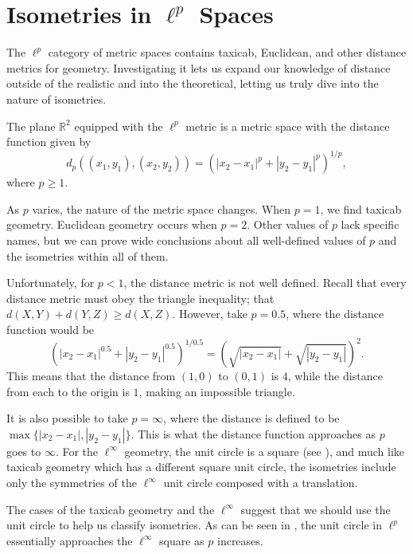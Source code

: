 \documentclass{mystyle}
\begin{document}
\section{Isometries in $\ell^p$ Spaces}\label{sec_five}
The $\ell^p$ category of metric spaces contains taxicab, Euclidean, and other distance metrics for geometry. Investigating it lets us expand our knowledge of distance outside of the realistic and into the theoretical, letting us truly dive into the nature of isometries.

The plane $\mathbb{R}^2$ equipped with the $\ell^p$ metric is a metric space with the distance function given by 
\[
d_{p}((x_1, y_1), (x_2, y_2)) = (|x_2-x_1|^p+|y_2-y_1|^p)^{1/p},
\]
where $p \geq 1$. 

As $p$ varies, the nature of the metric space changes. When $p=1$, we find taxicab geometry. Euclidean geometry occurs when $p=2$. Other values of $p$ lack specific names, but we can prove wide conclusions about all well-defined values of $p$ and the isometries within all of them.

Unfortunately, for $p<1$, the distance metric is not well defined. Recall that every distance metric must obey the triangle inequality; that $d(X,Y) + d(Y,Z) \ge d(X,Z)$. However, take $p=0.5$, where the distance function would be 
\[
    (|x_2-x_1|^{0.5}+|y_2-y_1|^{0.5})^{1/0.5} = (\sqrt{|x_2-x_1|}+\sqrt{|y_2-y_1|})^2.
\]
This means that the distance from $(1,0)$ to $(0,1)$ is $4$, while the distance from each to the origin is $1$, making an impossible triangle. 

It is also possible to take $p = \infty$, where the distance is defined to be $\max \{|x_2-x_1|, |y_2-y_1|\}$. This is what the distance function approaches as $p$ goes to $\infty$. For the $\ell^{\infty}$ geometry, the unit circle is a square (see ), and much like taxicab geometry which has a different square unit circle, the isometries include only the symmetries of the $\ell^{\infty}$ unit circle composed with a translation. 

The cases of the taxicab geometry and the $\ell^{\infty}$ suggest that we should use the unit circle to help us classify isometries. As can be seen in , the unit circle in $\ell^{p}$ essentially approaches the $\ell^{\infty}$ square as $p$ increases.
\end{document}
